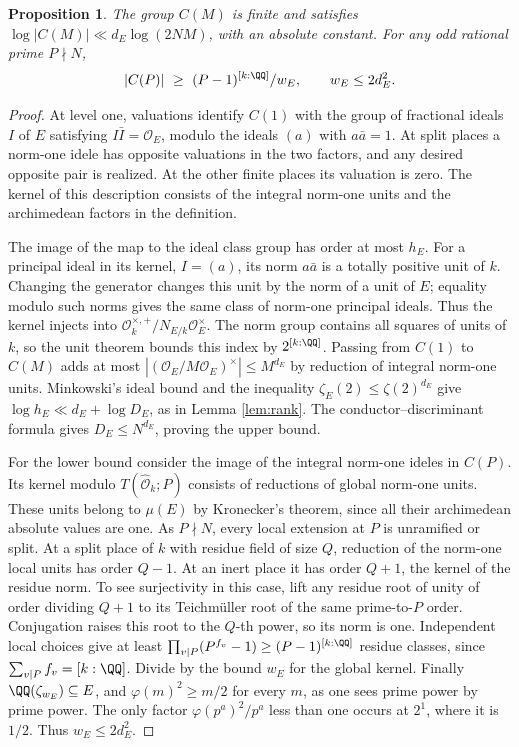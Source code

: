 \documentclass[a4paper,11pt]{article}
\newtheorem{proposition}{Proposition}[section]
\theoremstyle{definition}
\theoremstyle{remark}
\numberwithin{equation}{section}
\newcommand{\OO}{\mathcal O}
\begin{document}
\begin{proposition}\label{prop:torus}
The group \(C(M)\) is finite and satisfies \(\log|C(M)|\ll d_E\log(2NM)\), with an absolute constant. For any odd rational prime \(P\nmid N\),
\begin{equation}
           |C(P)|\ \ge\ (P-1)^{[k:\QQ]}/w_E,\qquad
           w_E\le 2d_E^2 .
 \label{eq:ray}
\end{equation}
\end{proposition}
\begin{proof}
At level one, valuations identify \(C(1)\) with the group of fractional ideals \(I\) of \(E\) satisfying \(I\bar I=\OO_E\), modulo the ideals \((a)\) with \(a\bar a=1\). At split places a norm-one idele has opposite valuations in the two factors, and any desired opposite pair is realized. At the other finite places its valuation is zero. The kernel of this description consists of the integral norm-one units and the archimedean factors in the definition.

The image of the map to the ideal class group has order at most \(h_E\). For a principal ideal in its kernel, \(I=(a)\), its norm \(a\bar a\) is a totally positive unit of \(k\). Changing the generator changes this unit by the norm of a unit of \(E\); equality modulo such norms gives the same class of norm-one principal ideals. Thus the kernel injects into \(\OO_k^{\times,+}/N_{E/k}\OO_E^\times\). The norm group contains all squares of units of \(k\), so the unit theorem bounds this index by \(2^{[k:\QQ]}\). Passing from \(C(1)\) to \(C(M)\) adds at most \(|(\OO_E/M\OO_E)^\times|\le M^{d_E}\) by reduction of integral norm-one units. Minkowski's ideal bound and the inequality \(\zeta_E(2)\le\zeta(2)^{d_E}\) give \(\log h_E\ll d_E+\log D_E\), as in Lemma \ref{lem:rank}. The conductor--discriminant formula gives \(D_E\le N^{d_E}\), proving the upper bound.

For the lower bound consider the image of the integral norm-one ideles in \(C(P)\). Its kernel modulo \(T(\widehat{\OO}_k;P)\) consists of reductions of global norm-one units. These units belong to \(\mu(E)\) by Kronecker's theorem, since all their archimedean absolute values are one. As \(P\nmid N\), every local extension at \(P\) is unramified or split. At a split place of \(k\) with residue field of size \(Q\), reduction of the norm-one local units has order \(Q-1\). At an inert place it has order \(Q+1\), the kernel of the residue norm. To see surjectivity in this case, lift any residue root of unity of order dividing \(Q+1\) to its Teichm\"uller root of the same prime-to-\(P\) order. Conjugation raises this root to the \(Q\)-th power, so its norm is one. Independent local choices give at least \(\prod_{v\mid P}(P^{f_v}-1)\ge(P-1)^{[k:\QQ]}\) residue classes, since \(\sum_{v\mid P} f_v=[k:\QQ]\). Divide by the bound \(w_E\) for the global kernel. Finally \(\QQ(\zeta_{w_E})\subseteq E\), and \(\varphi(m)^2\ge m/2\) for every \(m\), as one sees prime power by prime power. The only factor \(\varphi(p^a)^2/p^a\) less than one occurs at \(2^1\), where it is \(1/2\). Thus \(w_E\le2d_E^2\).
\end{proof}
\end{document}

